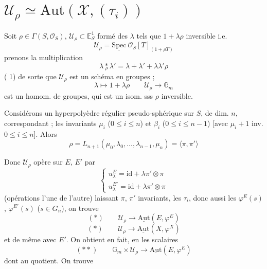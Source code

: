 \documentclass[11pt,a4paper]{article}
\begin{document}
\section{$\mathcal{U}_\rho \simeq \mathrm{Aut}(\mathcal{X}, (\tau_i))$}

Soit $\rho \in \Gamma(S, \mathcal{O}_S)$, $\mathcal{U}_\rho \subset \mathbb{E}^1_S$ formé des $\lambda$ tels que $1 + \lambda\rho$ inversible i.e.
\[
\mathcal{U}_\rho = \underline{\mathrm{Spec}}\ \mathcal{O}_S[T]_{(1 + \rho T)}
\]
prenons la multiplication
\[
\lambda \mathbin{\underset{\rho}{*}} \lambda' = \lambda + \lambda' + \lambda\lambda'\rho
\]
( \ill{} 1) de sorte que $\mathcal{U}_\rho$ est un schéma en groupes ;
\[
\lambda \longmapsto 1 + \lambda\rho \qquad \mathcal{U}_\rho \longrightarrow \mathbb{G}_m
\]
est un homom. de groupes, qui est un isom. sss $\rho$ inversible.

Considérons un hyperpolyèdre régulier  pseudo-sphérique sur $S$, de dim. $n$, correspondant ; les invariants $\mu_i$ ($0 \leq i \leq n$) et $\beta_i$ ($0 \leq i \leq n-1$) [avec $\mu_i + 1$ inv. $0 \leq i \leq n$]. Alors 
\[
\rho = L_{n+1}(\mu_0, \lambda_0, \ldots, \lambda_{n-1}, \mu_n) = \langle \pi, \pi'\rangle
\]

Donc $\mathcal{U}_\rho$ opère  sur $E$, $E'$ par
\[
\begin{cases}
u_\lambda^{E} = \mathrm{id} + \lambda\pi' \otimes \pi\\
u_\lambda^{E'} = \mathrm{id} + \lambda\pi' \otimes \pi
\end{cases}
\]
(opérations   l'une de l'autre) laissant $\pi$, $\pi'$ invariants, les $\tau_i$, donc aussi les $\varphi^{E}(s)$, $\varphi^{E'}(s)$ ($s \in G_n$), on trouve
\[
(*) \qquad \mathcal{U}_\rho \longrightarrow \underline{\mathrm{Aut}}(E, \varphi^{E})
\]
\[
(*) \qquad \mathcal{U}_\rho \longrightarrow \underline{\mathrm{Aut}}(X, \varphi^{X})
\]
et de même avec $E'$. On obtient en fait, en  les scalaires
\[
(**) \qquad \mathbb{G}_m \times \mathcal{U}_\rho \longrightarrow \underline{\mathrm{Aut}}(E, \varphi^{E})
\]
dont  au quotient. On trouve
\end{document}
